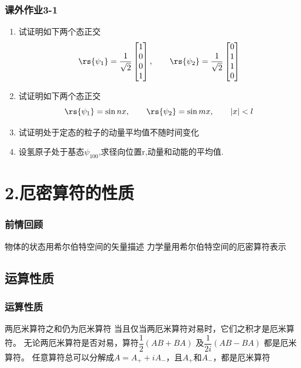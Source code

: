 \begin{frame}
    \frametitle{课外作业3-1}
    \begin{enumerate}
        \item 试证明如下两个态正交
        \[\rs{\psi_1}=\frac{1}{\sqrt{2}}
        \begin{bmatrix}
            1 \\ 
            0 \\  
            0 \\ 
            1 
        \end{bmatrix}, \qquad  \rs{\psi_2}=\frac{1}{\sqrt{2}}
        \begin{bmatrix}
            0 \\ 
            1 \\  
            1 \\ 
            0 
        \end{bmatrix} \]
        \item 试证明如下两个态正交
        \[ \rs{\psi_1}=\sin nx,\qquad \rs{\psi_2}=\sin mx,\qquad  \left|x\right|<l      
        \]
        \item 试证明处于定态的粒子的动量平均值不随时间变化
        \item 设氢原子处于基态$\psi_{100}$,求径向位置r,动量和动能的平均值. 
    \end{enumerate}
    
\end{frame}


\section{2.厄密算符的性质}

\begin{frame}
    \frametitle{前情回顾}
    \begin{itemize}
        \Item 物体的状态用希尔伯特空间的矢量描述
        \Item 力学量用希尔伯特空间的厄密算符表示
    \end{itemize}
\end{frame} 

\subsection{运算性质}

\begin{frame}
    \frametitle{运算性质}
    \begin{enumerate}
        \Item 两厄米算符之和仍为厄米算符
        \Item 当且仅当两厄米算符对易时，它们之积才是厄米算符。
        \Item 无论两厄米算符是否对易，算符$\dfrac{1}{2}(AB+BA)$ 及$\dfrac{1}{2i}(AB-BA) $  都是厄米算符。
        \Item 任意算符总可以分解成$A=A_+ +iA_-$，且$A_+$和$A_-$，都是厄米算符
    \end{enumerate}
\end{frame} 

